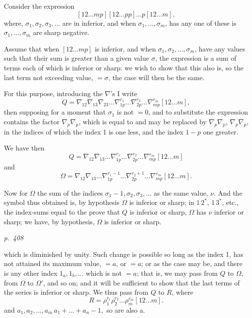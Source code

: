 \documentclass[11pt,a4paper]{article}
\theoremstyle{plain}
\theoremstyle{definition}
\begin{document}
Consider the expression
\[
[12 \ldots m p] [12 \ldots p p] \ldots p[12 \ldots m],
\]
where, $\sigma_1, \sigma_2, \sigma_3, \ldots$ are in inferior, and when $\sigma_1, \ldots, \sigma_m$, has any one of these is $\sigma_1, \ldots, \sigma_m$
are sharp negative.

Assume that when $[12 \ldots m p]$ is inferior, and when $\sigma_1, \sigma_2, \ldots, \sigma_m$, have any values such
that their sum is greater than a given value $\sigma$, the expression is a sum of
terms each of which is inferior or sharp: we wish to show that this also is, so the
last term not exceeding value, $= \sigma$, the case will then be the same.

For this purpose, introducing the $\nabla$'s I write
\[
Q = \nabla_{12} \nabla_{13} \nabla_{23} \ldots \nabla_{1p}^{r_1} \ldots \nabla_{2p}^{r_2} \ldots \nabla_{mp}^{r_m} [12 \ldots m],
\]
then supposing for a moment that $\sigma_1$ is not $= 0$, and to substitute the expression
contains the factor $\nabla_p \nabla_p$, which is equal to and may be replaced by $\nabla_p \nabla_p$, $\nabla_p \nabla_p$,
in the indices of which the index 1 is one less, and the index $1 - p$ one greater.

We have then
\[
Q = \nabla_{12} \nabla_{13} \ldots \nabla_{1p}^{r_1} \ldots \nabla_{2p}^{r_2} \ldots \nabla_{mp}^{r_m} [12 \ldots m]
\]
and
\[
\Omega = \nabla_{12} \nabla_{13} \ldots \nabla_{1p}^{r_1 - 1} \ldots \nabla_{2p}^{r_2 + 1} \ldots \nabla_{mp}^{r_m} [12 \ldots m].
\]

Now for $\Omega$ the sum of the indices $\sigma_1 - 1, \sigma_2, \sigma_3, \ldots$ as the same value, $\nu$.  And the symbol thus obtained
is, by hypothesis $\Omega$ is inferior or sharp; in $1\,2^*$, $1\,3^*$, etc., the index-sums equal to the
prove that $Q$ is inferior or sharp, $\Omega$ has $\nu$ inferior or sharp; we have, by hypothesis,
$\Omega$ is inferior or sharp.

\clearpage

\bigskip
\textit{p.~408}
\smallskip

\noindent
which is diminished by unity.  Such change is possible so long as the index 1, has
not attained its maximum value, $= a$, or $= a$; or as the case may be, and there is any
other index $1_a, 1_b, \ldots$ which is not $= a$; that is, we may pass from $Q$ to $\Omega$, from
$\Omega$ to $\Omega'$, and so on; and it will be sufficient to show that the last terms of the
series is inferior or sharp.  We thus pass from $Q$ to $R$, where
\[
R = \rho_1^{r_1} \rho_2^{r_2} \ldots \rho_m^{r_m} [12 \ldots m].
\]
and $a_1, a_2, \ldots, a_m \,a_1 + \ldots + a_n - 1, $ so are also a.
\end{document}

